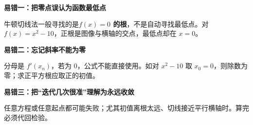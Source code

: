 \clearpage
\begin{trapbox}
\textbf{\textcolor{CTrap}{易错一：把零点误认为函数最低点}}
\par\medskip
\begin{center}

\end{center}
\medskip
牛顿切线法一般寻找的是\textbf{$f(x)=0$ 的根}，不是自动寻找最低点。对 $f(x)=x^2-10$，正根是图像与横轴的交点，最低点却在 $x=0$。
\end{trapbox}
\clearpage
\begin{trapbox}
\textbf{\textcolor{CTrap}{易错二：忘记斜率不能为零}}
\par\medskip
\begin{center}

\end{center}
\medskip
分母是 $f'(x_n)$，若为 $0$，公式不能直接使用。如对 $x^2-10$ 取 $x_0=0$，则除数为零；求正平方根应取正的初值。
\end{trapbox}
\clearpage
\begin{trapbox}
\textbf{\textcolor{CTrap}{易错三：把“迭代几次很准”理解为永远收敛}}
\par\medskip
\begin{center}

\end{center}
\medskip
任意方程或任意起点都可能失败；尤其初值离根太远、切线接近平行横轴时。算完必须代回检验。
\end{trapbox}
